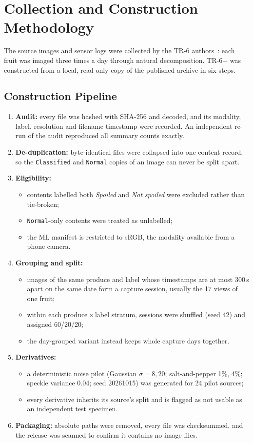 \documentclass[journal]{IEEEtran}
\begin{document}
\section{Collection and Construction Methodology}
The source images and sensor logs were collected by the TR-6 authors~\cite{tr6}: each fruit was imaged three times a day through natural decomposition. TR-6+ was constructed from a local, read-only copy of the published archive in six steps.

\subsection{Construction Pipeline}
\begin{enumerate}
  \item \textbf{Audit:} every file was hashed with SHA-256 and decoded, and its modality, label, resolution and filename timestamp were recorded. An independent re-run of the audit reproduced all summary counts exactly.
  \item \textbf{De-duplication:} byte-identical files were collapsed into one content record, so the \texttt{Classified} and \texttt{Normal} copies of an image can never be split apart.
  \item \textbf{Eligibility:}
  \begin{itemize}
    \item contents labelled both \emph{Spoiled} and \emph{Not spoiled} were excluded rather than tie-broken;
    \item \texttt{Normal}-only contents were treated as unlabelled;
    \item the ML manifest is restricted to sRGB, the modality available from a phone camera.
  \end{itemize}
  \item \textbf{Grouping and split:}
  \begin{itemize}
    \item images of the same produce and label whose timestamps are at most 300\,s apart on the same date form a capture session, usually the 17 views of one fruit;
    \item within each produce\,$\times$\,label stratum, sessions were shuffled (seed 42) and assigned 60/20/20;
    \item the day-grouped variant instead keeps whole capture days together.
  \end{itemize}
  \item \textbf{Derivatives:}
  \begin{itemize}
    \item a deterministic noise pilot (Gaussian $\sigma\!=\!8,20$; salt-and-pepper 1\%, 4\%; speckle variance 0.04; seed 20261015) was generated for 24 pilot sources;
    \item every derivative inherits its source's split and is flagged as not usable as an independent test specimen.
  \end{itemize}
  \item \textbf{Packaging:} absolute paths were removed, every file was checksummed, and the release was scanned to confirm it contains no image files.
\end{enumerate}
\end{document}
